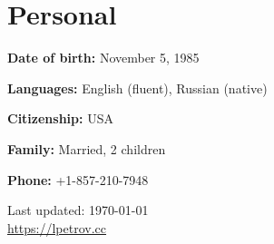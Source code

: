 \documentclass[letterpaper,11pt]{article}
\def\footerlink{https://lpetrov.cc}
\begin{document}
\section*{Personal}

\textbf{Date of birth:} November 5, 1985

\textbf{Languages:} English (fluent), Russian (native)

\textbf{Citizenship:} USA

\textbf{Family:} Married, 2 children

\textbf{Phone:} +1-857-210-7948


\bigskip

\begin{center}
	\begin{footnotesize}
		Last updated: \today \\ \href{\footerlink}{\url{\footerlink}}
	\end{footnotesize}
\end{center}
\end{document}
